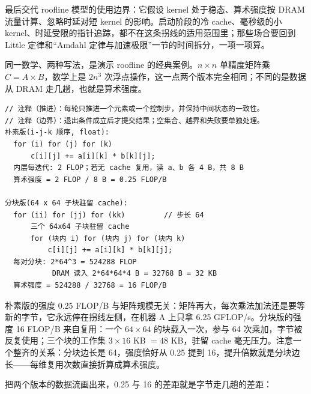 最后交代 roofline 模型的使用边界：它假设 kernel 处于稳态、算术强度按 DRAM 流量计算、忽略时延对短 kernel 的影响。启动阶段的冷 cache、毫秒级的小 kernel、时延受限的指针追踪，都不在这条拐线的适用范围里；那些场合要回到 Little 定律和“Amdahl 定律与加速极限”一节的时间拆分，一项一项算。

同一数学、两种写法，是演示 roofline 的经典案例。$n\times n$ 单精度矩阵乘 $C=A\times B$，数学上是 $2n^3$ 次浮点操作，这一点两个版本完全相同；不同的是数据从 DRAM 走几趟，也就是算术强度。

\begin{lstlisting}
// 注释（推进）：每轮只推进一个元素或一个控制步，并保持中间状态的一致性。
// 注释（边界）：退出条件成立后才提交结果；空集合、越界和失败要单独处理。
朴素版(i-j-k 顺序, float):
  for (i) for (j) for (k)
      c[i][j] += a[i][k] * b[k][j];
  内层每迭代: 2 FLOP；若无 cache 复用，读 a、b 各 4 B，共 8 B
  算术强度 = 2 FLOP / 8 B = 0.25 FLOP/B

分块版(64 x 64 子块驻留 cache):
  for (ii) for (jj) for (kk)         // 步长 64
      三个 64x64 子块驻留 cache
      for (块内 i) for (块内 j) for (块内 k)
          c[i][j] += a[i][k] * b[k][j];
  每对分块: 2*64^3 = 524288 FLOP
           DRAM 读入 2*64*64*4 B = 32768 B = 32 KB
  算术强度 = 524288 / 32768 = 16 FLOP/B
\end{lstlisting}

朴素版的强度 0.25 FLOP/B 与矩阵规模无关：矩阵再大，每次乘法加法还是要等新的字节，它永远停在拐线左侧，在机器 A 上只拿 6.25 GFLOP/s。分块版的强度 16 FLOP/B 来自复用：一个 $64\times64$ 的块载入一次，参与 64 次乘加，字节被反复使用；三个块的工作集 $3\times16$ KB $=48$ KB，驻留 cache 毫无压力。注意一个整齐的关系：分块边长是 64，强度恰好从 0.25 提到 16，提升倍数就是分块边长——每维复用次数直接折算成算术强度。

把两个版本的数据流画出来，0.25 与 16 的差距就是字节走几趟的差距：

